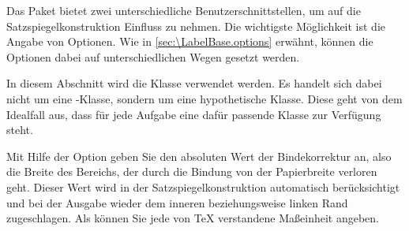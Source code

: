 Das Paket  bietet zwei unterschiedliche
Benutzerschnittstellen, um auf die Satzspiegelkonstruktion Einfluss zu
nehmen. Die wichtigste Möglichkeit ist die Angabe von Optionen. Wie
in \autoref{sec:\LabelBase.options} erwähnt, können die Optionen dabei auf
unterschiedlichen Wegen gesetzt werden.

In diesem Abschnitt wird die Klasse 
verwendet werden. Es handelt sich dabei nicht um eine \KOMAScript-Klasse,
sondern um eine hypothetische Klasse. Diese geht
von dem Idealfall aus, dass für jede Aufgabe eine dafür passende Klasse zur
Verfügung steht.


\begin{Declaration}
\end{Declaration}%
Mit Hilfe der Option
 geben Sie
den absoluten Wert der
Bindekorrektur an, also die
Breite des Bereichs, der durch die Bindung von der Papierbreite verloren
geht. Dieser Wert wird in der Satzspiegelkonstruktion automatisch
berücksichtigt und bei der Ausgabe wieder dem inneren beziehungsweise linken
Rand zugeschlagen. Als  können Sie jede von \TeX{}
verstandene Maßeinheit angeben.

